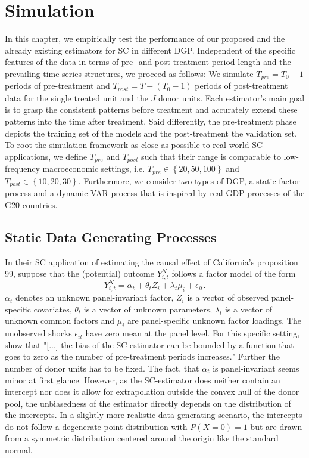 \section{Simulation}
In this chapter, we empirically test the performance of our proposed and the already existing estimators for \ac{SC} in different \ac{DGP}. Independent of the specific features of the data in terms of pre- and post-treatment period length and the prevailing time series structures, we proceed as follows: We simulate $T_{pre} = T_0 -1$ periods of pre-treatment and $T_{post} = T - (T_0 -1)$ periods of post-treatment data for the single treated unit and the $J$ donor units. Each estimator's main goal is to grasp the consistent patterns before treatment and accurately extend these patterns into the time after treatment. Said differently, the pre-treatment phase depicts the training set of the models and the post-treatment the validation set. To root the simulation framework as close as possible to real-world \ac{SC} applications, we define $T_{pre}$ and $T_{post}$ such that their range is comparable to low-frequency macroeconomic settings, i.e. $T_{pre} \in \left\lbrace 20,50,100\right\rbrace $ and $T_{post} \in \left\lbrace 10,20,30\right\rbrace$. Furthermore, we consider two types of \ac{DGP}, a static factor process and a dynamic \ac{VAR}-process that is inspired by real \ac{GDP} processes of the G20 countries.

\subsection{Static Data Generating Processes}

In their \ac{SC} application of estimating the causal effect of California's proposition 99, \cite{abadie:2010} suppose that the (potential) outcome $Y_{i,t}^{N}$ follows a factor model of the  form 
\begin{equation*}
	Y_{i,t}^{N} = \alpha_t + \theta_t Z_i + \lambda_t \mu_i + \epsilon_{it}.
\end{equation*}
$\alpha_t$ denotes an unknown panel-invariant factor, $Z_i$ is a vector of observed panel-specific covariates, $\theta_t$ is a vector of unknown parameters, $\lambda_t$ is a vector of unknown common factors and $\mu_i$ are panel-specific unknown factor loadings. The unobserved shocks $\epsilon_{it}$ have zero mean at the panel level. 
For this specific setting, \cite{abadie:2010} show that "[...] the bias of the SC-estimator can be bounded by a function that goes to zero as the number of pre-treatment periods increases." Further the number of donor units has to be fixed. The fact, that $\alpha_t$ is panel-invariant seems minor at first glance. However, as the \ac{SC}-estimator does neither contain an intercept nor does it allow for extrapolation outside the convex hull of the donor pool, the unbiasedness of the estimator directly depends on the distribution of the intercepts. In a slightly more realistic data-generating scenario, the intercepts do not follow a degenerate point distribution with $P(X = 0) = 1$ but are drawn from a symmetric distribution centered around the origin like the standard normal. 

